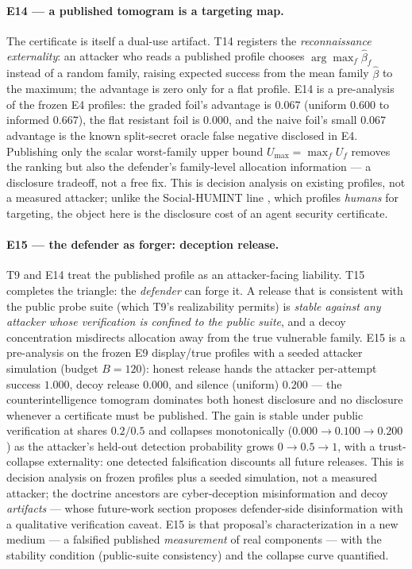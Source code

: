 \documentclass[acmsmall,review,anonymous]{acmart}
\begin{document}
\paragraph{E14 --- a published tomogram is a targeting map.}
The certificate is itself a dual-use artifact. T14 registers the
\emph{reconnaissance externality}: an attacker who reads a published profile
chooses $\arg\max_f\hat\beta_f$ instead of a random family, raising expected
success from the mean family $\hat\beta$ to the maximum; the advantage is zero
only for a flat profile. E14 is a pre-analysis of the frozen E4 profiles: the
graded foil's advantage is $0.067$ (uniform $0.600$ to informed $0.667$), the
flat resistant foil is $0.000$, and the naive foil's small $0.067$ advantage is
the known split-secret oracle false negative disclosed in E4. Publishing only
the scalar worst-family upper bound $U_{\max}=\max_f U_f$ removes the ranking
but also the defender's family-level allocation information --- a disclosure
tradeoff, not a free fix. This is decision analysis on existing profiles, not a
measured attacker; unlike the Social-HUMINT line \cite{socialhumint2026}, which
profiles \emph{humans} for targeting, the object here is the disclosure cost of
an agent security certificate.

\paragraph{E15 --- the defender as forger: deception release.}
T9 and E14 treat the published profile as an attacker-facing liability. T15
completes the triangle: the \emph{defender} can forge it. A release that is
consistent with the public probe suite (which T9's realizability permits) is
\emph{stable against any attacker whose verification is confined to the public
suite}, and a decoy concentration misdirects allocation away from the true
vulnerable family. E15 is a pre-analysis on the frozen E9 display/true
profiles with a seeded attacker simulation (budget $B=120$): honest release
hands the attacker per-attempt success $1.000$, decoy release $0.000$, and
silence (uniform) $0.200$ --- the counterintelligence tomogram dominates both
honest disclosure and no disclosure whenever a certificate must be published.
The gain is stable under public verification at shares $0.2/0.5$ and collapses
monotonically ($0.000\to0.100\to0.200$) as the attacker's held-out detection
probability grows $0\to0.5\to1$, with a trust-collapse externality: one
detected falsification discounts all future releases. This is decision
analysis on frozen profiles plus a seeded simulation, not a measured attacker;
the doctrine ancestors are cyber-deception misinformation
\cite{fergusonwalter2017,bodeau2013,perry2025} and decoy \emph{artifacts}
\cite{honeypotagents2026} --- whose future-work section proposes defender-side
disinformation with a qualitative verification caveat. E15 is that proposal's
characterization in a new medium --- a falsified published \emph{measurement}
of real components --- with the stability condition (public-suite consistency)
and the collapse curve quantified.
\end{document}

